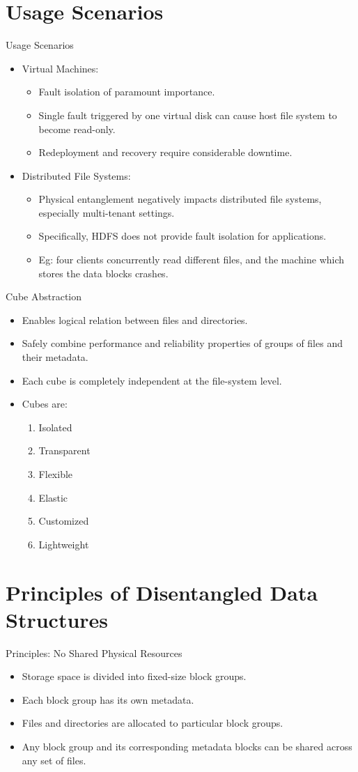 \documentclass[aspectratio=169]{beamer}
\newcommand{\bi}{\begin{itemize}}
\newcommand{\ei}{\end{itemize}}
\newcommand{\bn}{\begin{enumerate}}
\newcommand{\en}{\end{enumerate}}
\begin{document}
\section{Usage Scenarios}
\begin{frame}{Usage Scenarios}
    \bi
\item Virtual Machines:
    \bi
    \pause
\item Fault isolation of paramount importance.
\item Single fault triggered by one virtual disk can cause host file system to
    become read-only.
\item Redeployment and recovery require considerable downtime.
    \ei
    \pause
\item Distributed File Systems:
    \bi
    \pause
\item Physical entanglement negatively impacts distributed file systems, especially multi-tenant
    settings.
\item Specifically, HDFS does not provide fault isolation for applications.
\item Eg: four clients concurrently read different files, and the machine
    which stores the data blocks crashes.
    \ei
    \ei
\end{frame}

\begin{frame}{Cube Abstraction}
    \bi
\item Enables logical relation between files and directories.
\item Safely combine performance and reliability properties of groups of files
    and their metadata.
\item Each cube is completely independent at the file-system level.
\item Cubes are:
    \bn
\item Isolated
\item Transparent
\item Flexible
\item Elastic
\item Customized
\item Lightweight
    \en
    \ei
\end{frame}

\section{Principles of Disentangled Data Structures}
\begin{frame}{Principles: No Shared Physical Resources}
    \bi
\item Storage space is divided into fixed-size block groups.
\item Each block group has its own metadata.
\item Files and directories are allocated to particular block groups.
\item Any block group and its corresponding metadata blocks can be shared across
    any set of files.
    \ei
\end{frame}
\end{document}
